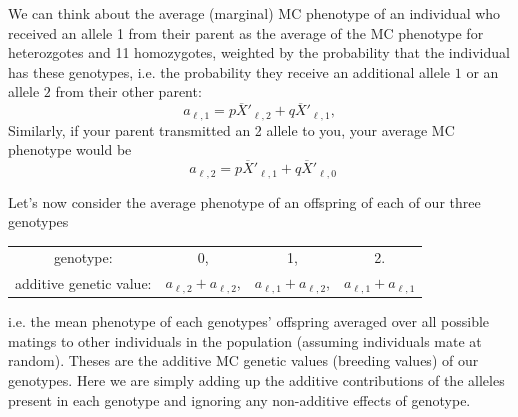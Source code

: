 We can think about the average
(marginal) MC
phenotype of an individual who received an allele 1 from their parent as the average of the MC phenotype for heterozgotes and 11 homozygotes, weighted by the probability that
the individual has these genotypes, i.e. the probability they receive an additional allele $1$ or an allele $2$ from their other parent:
\begin{equation} 
  a_{\ell, 1} = p\overline{X}'_{\ell,2}  + q\overline{X}'_{\ell,1},
\end{equation}
Similarly, if your parent transmitted an 2 allele to you, your average
MC phenotype would be
\begin{equation}
  ~~ a_{\ell, 2} = p\overline{X}'_{\ell,1}  + q\overline{X}'_{\ell,0} 
\end{equation}



Let's now consider the average phenotype of an offspring of each of our
three genotypes
\begin{center}
\begin{tabular}{cccc}
genotype: & 0, & 1, & 2.\\
additive genetic value: & $a_{\ell,2}+ a_{\ell,2}$, & $a_{\ell,1}+a_{\ell,2}$, & $a_{\ell,1}+a_{\ell,1}$   \label{add_values}
\end{tabular}
\end{center}
%
i.e. the mean phenotype of each genotypes' offspring
averaged over all possible matings to other individuals in the
population (assuming individuals mate at random). Theses are the
additive MC genetic values (breeding values) of our genotypes. 
Here we are simply adding up the additive contributions of the alleles present
in each genotype and ignoring any non-additive effects of genotype.

